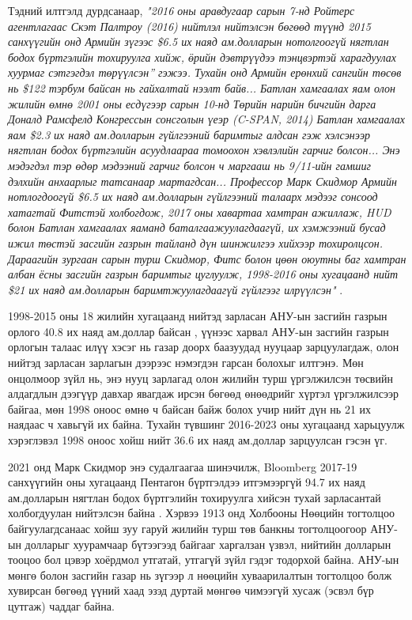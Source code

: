 \documentclass[10pt,twocolumn,letterpaper]{article}
\begin{document}
Тэдний илтгэлд дурдсанаар, \textit{"2016 оны аравдугаар сарын 7-нд Ройтерс агентлагаас Скэт Палтроу (2016) нийтлэл нийтэлсэн бөгөөд түүнд 2015 санхүүгийн онд Армийн зүгээс \$6.5 их наяд ам.долларын нотолгоогүй нягтлан бодох бүртгэлийн тохируулга хийж, \"өрийн дэвтрүүдээ тэнцвэртэй харагдуулах хуурмаг сэтгэгдэл төрүүлсэн” гэжээ. Тухайн онд Армийн ерөнхий сангийн төсөв нь \$122 тэрбум байсан нь гайхалтай нээлт байв... Батлан хамгаалах яам олон жилийн өмнө 2001 оны есдүгээр сарын 10-нд Төрийн нарийн бичгийн дарга Доналд Рамсфелд Конгрессын сонсголын үеэр (C-SPAN, 2014) Батлан хамгаалах яам \$2.3 их наяд ам.долларын гүйлгээний баримтыг алдсан гэж хэлсэнээр нягтлан бодох бүртгэлийн асуудлаараа томоохон хэвлэлийн гарчиг болсон... Энэ мэдэгдэл тэр өдөр мэдээний гарчиг болсон ч маргааш нь 9/11-ийн гамшиг дэлхийн анхаарлыг татсанаар мартагдсан... Профессор Марк Скидмор Армийн нотлогдоогүй \$6.5 их наяд ам.долларын гүйлгээний талаарх мэдээг сонсоод хатагтай Фитстэй холбогдож, 2017 оны хавартаа хамтран ажиллаж, HUD болон Батлан хамгаалах яаманд баталгаажуулагдаагүй, их хэмжээний бусад ижил төстэй засгийн газрын тайланд дүн шинжилгээ хийхээр тохиролцсон. Дараагийн зургаан сарын турш Скидмор, Фитс болон цөөн оюутны баг хамтран албан ёсны засгийн газрын баримтыг цуглуулж, 1998-2016 оны хугацаанд нийт \$21 их наяд ам.долларын баримтжуулагдаагүй гүйлгээг илрүүлсэн"} \cite{12}.

1998-2015 оны 18 жилийн хугацаанд нийтэд зарласан АНУ-ын засгийн газрын орлого 40.8 их наяд ам.доллар байсан \cite{15}, үүнээс харвал АНУ-ын засгийн газрын орлогын талаас илүү хэсэг нь газар доорх баазуудад нууцаар зарцуулагдаж, олон нийтэд зарласан зарлагын дээрээс нэмэгдэн гарсан болохыг илтгэнэ. Мөн онцолмоор зүйл нь, энэ нууц зарлагад олон жилийн турш үргэлжилсэн төсвийн алдагдлын дээгүүр давхар явагдаж ирсэн бөгөөд өнөөдрийг хүртэл үргэлжилсээр байгаа, мөн 1998 оноос өмнө ч байсан байж болох учир нийт дүн нь 21 их наядаас ч хавьгүй их байна. Тухайн түвшинг 2016-2023 оны хугацаанд харьцуулж хэрэглэвэл 1998 оноос хойш нийт 36.6 их наяд ам.доллар зарцуулсан гэсэн үг.

2021 онд Марк Скидмор энэ судалгаагаа шинэчилж, Bloomberg 2017-19 санхүүгийн оны хугацаанд Пентагон бүртгэлдээ итгэмээргүй 94.7 их наяд ам.долларын нягтлан бодох бүртгэлийн тохируулга хийсэн тухай зарласантай холбогдуулан нийтэлсэн байна \cite{17,18}. Хэрвээ 1913 онд Холбооны Нөөцийн тогтолцоо байгуулагдсанаас хойш зуу гаруй жилийн турш төв банкны тогтолцоогоор АНУ-ын долларыг хуурамчаар бүтээгээд байгааг харгалзан үзвэл, нийтийн долларын тооцоо бол цэвэр хоёрдмол утгатай, утгагүй зүйл гэдэг тодорхой байна. АНУ-ын мөнгө болон засгийн газар нь зүгээр л нөөцийн хуваарилалтын тогтолцоо болж хувирсан бөгөөд үүний хаад эзэд дуртай мөнгөө чимээгүй хусаж (эсвэл бүр цутгаж) чаддаг байна.
\end{document}
